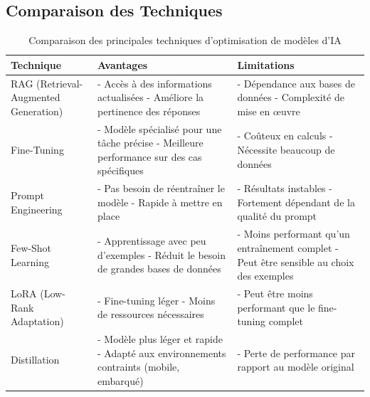 \subsection{Comparaison des Techniques}
\begin{table}[h!]
	\centering
	\begin{tabular}{|p{3cm}|p{5cm}|p{5cm}|}
		\hline
		\textbf{Technique}                   & \textbf{Avantages}                                                                                  & \textbf{Limitations}                                                                              \\
		\hline
		RAG (Retrieval-Augmented Generation) & - Accès à des informations actualisées \newline - Améliore la pertinence des réponses               & - Dépendance aux bases de données \newline - Complexité de mise en œuvre                          \\
		\hline
		Fine-Tuning                          & - Modèle spécialisé pour une tâche précise \newline - Meilleure performance sur des cas spécifiques & - Coûteux en calculs \newline - Nécessite beaucoup de données                                     \\
		\hline
		Prompt Engineering                   & - Pas besoin de réentraîner le modèle \newline - Rapide à mettre en place                           & - Résultats instables \newline - Fortement dépendant de la qualité du prompt                      \\
		\hline
		Few-Shot Learning                    & - Apprentissage avec peu d'exemples \newline - Réduit le besoin de grandes bases de données         & - Moins performant qu'un entraînement complet \newline - Peut être sensible au choix des exemples \\
		\hline
		LoRA (Low-Rank Adaptation)           & - Fine-tuning léger \newline - Moins de ressources nécessaires                                      & - Peut être moins performant que le fine-tuning complet                                           \\
		\hline
		Distillation                         & - Modèle plus léger et rapide \newline - Adapté aux environnements contraints (mobile, embarqué)    & - Perte de performance par rapport au modèle original                                             \\
		\hline
	\end{tabular}
	\caption{Comparaison des principales techniques d'optimisation de modèles d'IA}
	\label{tab:comparaison-techniques}
\end{table}
\newpage
{}
